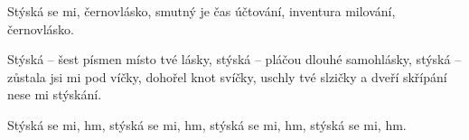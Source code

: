 \beginverse{}
Stýská se mi, černovlásko,
smutný je čas účtování,
inventura milování, černovlásko.  
\endverse{}

\repeatingchorus{}
\beginchorus{}
Stýská -- šest písmen místo tvé lásky,
stýská -- pláčou dlouhé samohlásky,
stýská -- zůstala jsi mi pod víčky,
dohořel knot svíčky, uschly tvé slzičky
a dveří skřípání nese mi stýskání.
\endchorus{}

\beginverse*{}
Stýská se mi, hm,  stýská se mi, hm, 
stýská se mi, hm,  stýská se mi, hm. 
\endverse{}

\endsong{}
